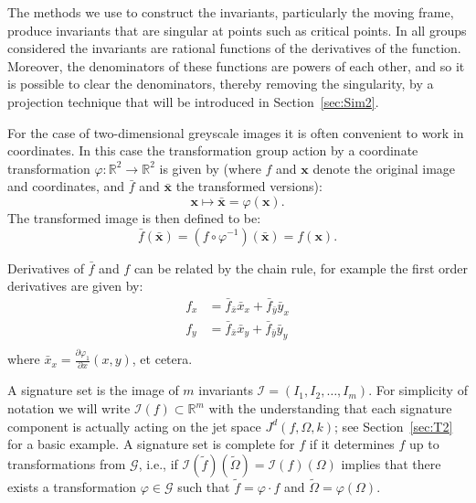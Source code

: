 \documentclass{artjlt}
\begin{document}
The methods we use to construct the invariants, particularly the moving frame, produce invariants that are singular at points such as critical points. In all groups considered the invariants are rational functions of the derivatives of the function. Moreover, the denominators of these functions are powers of each other, and so it is possible to clear the denominators, thereby removing the singularity, by a projection technique that will be introduced in Section~\ref{sec:Sim2}.

For the case of two-dimensional greyscale images it is often convenient to work in coordinates. In this case the transformation group action by a coordinate transformation $\varphi \colon \mathbb{R}^2 \to \mathbb{R}^2$ is given by (where $f$ and $\mathbf{x}$ denote the original image and coordinates, and $\bar{f}$ and $\bar{\mathbf{x}}$ the transformed versions):
\begin{equation}\label{eq:transformation}
  \mathbf{x} \mapsto \bar{\mathbf{x}} = \varphi(\mathbf{x}).
\end{equation}
The transformed image is then defined to be:
\begin{equation}\label{eq:fbarequalsf}
  \bar{f}(\bar{\mathbf{x}}) = (f\circ\varphi^{-1})(\bar{\mathbf{x}}) = f(\mathbf{x}).
\end{equation}

Derivatives of $\bar{f}$ and $f$ can be related by the chain rule, for example the first order derivatives are given by:
\begin{equation}\label{eq:prolongation}
  \begin{aligned}
    f_x &= \bar{f}_{\bar{x}} \bar{x}_x + \bar{f}_{\bar{y}}\bar{y}_x \\
    f_y &= \bar{f}_{\bar{x}} \bar{x}_y + \bar{f}_{\bar{y}}\bar{y}_y \\
  \end{aligned}
\end{equation}
where $\bar{x}_x = \frac{\partial \varphi_1}{\partial x}(x, y)$, et cetera. %

A signature set is the image of $m$ invariants
$\mathcal{I}=(I_1,I_2,\dots,I_m)$. For simplicity of notation we will write
$\mathcal{I}(f) \subset \mathbb{R}^m$ with the understanding that each signature component is
actually acting on the jet space $J^d(f, \Omega, k)$; see Section~\ref{sec:T2} for a basic
example. A signature set is complete for $f$ if it determines $f$ up to
transformations from $\mathcal{G}$, i.e., if $\mathcal{I}(\tilde
f)(\tilde\Omega) = \mathcal{I}(f)(\Omega)$ implies that there exists a
transformation $\varphi\in \mathcal{G}$ such that $\tilde f = \varphi\cdot f$
and $\tilde \Omega = \varphi(\Omega)$. 
\end{document}
